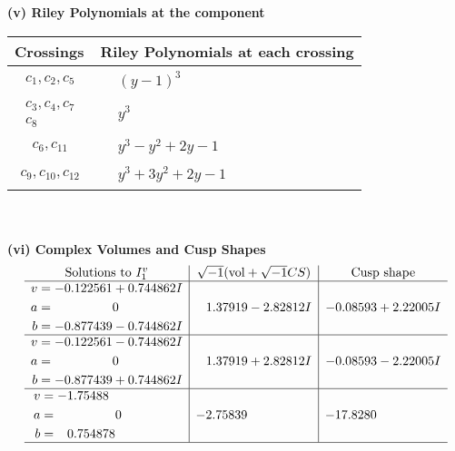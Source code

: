 \documentclass[1p]{elsarticle_modified}
\theoremstyle{definition}
\newcommand{\I}{\sqrt{-1}}
\begin{document}
\newpage\renewcommand{\arraystretch}{1}
\flushleft \textbf{(v) Riley Polynomials at the component}\newline \\
\begin{tabular}{m{50pt}|m{274pt}}
Crossings & \hspace{64pt}Riley Polynomials at each crossing \\
\hline $$\begin{aligned}c_{1},c_{2},c_{5}\end{aligned}$$&$\begin{aligned}
&(y-1)^3
\end{aligned}$\\
\hline $$\begin{aligned}c_{3},c_{4},c_{7}\\c_{8}\end{aligned}$$&$\begin{aligned}
&y^3
\end{aligned}$\\
\hline $$\begin{aligned}c_{6},c_{11}\end{aligned}$$&$\begin{aligned}
&y^3- y^2+2 y-1
\end{aligned}$\\
\hline $$\begin{aligned}c_{9},c_{10},c_{12}\end{aligned}$$&$\begin{aligned}
&y^3+3 y^2+2 y-1
\end{aligned}$\\
\hline
\end{tabular}\\~\\
\newpage\flushleft \textbf{(vi) Complex Volumes and Cusp Shapes}
$$\begin{array}{c|c|c}  
\text{Solutions to }I^v_{1}& \I (\text{vol} + \sqrt{-1}CS) & \text{Cusp shape}\\
 \hline 
\begin{aligned}
v &= -0.122561 + 0.744862 I \\
a &= \phantom{-0.000000 } 0 \\
b &= -0.877439 - 0.744862 I\end{aligned}
 & \phantom{-}1.37919 - 2.82812 I & -0.08593 + 2.22005 I \\ \hline\begin{aligned}
v &= -0.122561 - 0.744862 I \\
a &= \phantom{-0.000000 } 0 \\
b &= -0.877439 + 0.744862 I\end{aligned}
 & \phantom{-}1.37919 + 2.82812 I & -0.08593 - 2.22005 I \\ \hline\begin{aligned}
v &= -1.75488\phantom{ +0.000000I} \\
a &= \phantom{-0.000000 } 0 \\
b &= \phantom{-}0.754878\phantom{ +0.000000I}\end{aligned}
 & -2.75839\phantom{ +0.000000I} & -17.8280\phantom{ +0.000000I}\\
 \hline 
 \end{array}$$\newpage
\end{document}

